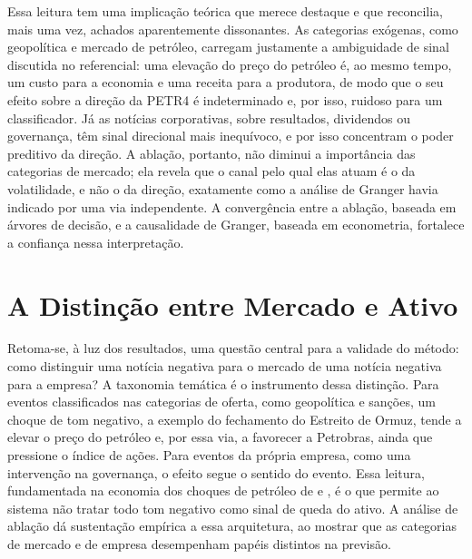 Essa leitura tem uma implicação teórica que merece destaque e que reconcilia, mais uma vez, achados aparentemente dissonantes. As categorias exógenas, como geopolítica e mercado de petróleo, carregam justamente a ambiguidade de sinal discutida no referencial: uma elevação do preço do petróleo é, ao mesmo tempo, um custo para a economia e uma receita para a produtora, de modo que o seu efeito sobre a direção da PETR4 é indeterminado e, por isso, ruidoso para um classificador. Já as notícias corporativas, sobre resultados, dividendos ou governança, têm sinal direcional mais inequívoco, e por isso concentram o poder preditivo da direção. A ablação, portanto, não diminui a importância das categorias de mercado; ela revela que o canal pelo qual elas atuam é o da volatilidade, e não o da direção, exatamente como a análise de Granger havia indicado por uma via independente. A convergência entre a ablação, baseada em árvores de decisão, e a causalidade de Granger, baseada em econometria, fortalece a confiança nessa interpretação.

\section{A Distinção entre Mercado e Ativo}

Retoma-se, à luz dos resultados, uma questão central para a validade do método: como distinguir uma notícia negativa para o mercado de uma notícia negativa para a empresa? A taxonomia temática é o instrumento dessa distinção. Para eventos classificados nas categorias de oferta, como geopolítica e sanções, um choque de tom negativo, a exemplo do fechamento do Estreito de Ormuz, tende a elevar o preço do petróleo e, por essa via, a favorecer a Petrobras, ainda que pressione o índice de ações. Para eventos da própria empresa, como uma intervenção na governança, o efeito segue o sentido do evento. Essa leitura, fundamentada na economia dos choques de petróleo de  e , é o que permite ao sistema não tratar todo tom negativo como sinal de queda do ativo. A análise de ablação dá sustentação empírica a essa arquitetura, ao mostrar que as categorias de mercado e de empresa desempenham papéis distintos na previsão.

